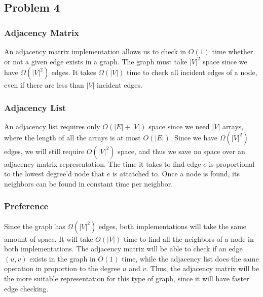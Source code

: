 \documentclass{article}
\begin{document}
\subsection*{Problem 4}
\subsubsection*{Adjacency Matrix}
An adjacency matrix implementation allows us to check in $O(1)$ time whether or not a given edge exists in a graph.
The graph must take $|V|^2$ space since we have $\Omega (|V|^2)$ edges.
It takes $\Omega (|V|)$ time to check all incident edges of a node, even if there are less than $|V|$ incident edges.
\subsubsection*{Adjacency List}
An adjacency list requires only $O(|E| + |V|)$ space since we need $|V|$ arrays,
where the length of all the arrays is at most $O(|E|)$.
Since we have $\Omega (|V|^2)$ edges, we will still require $O(|V|^2)$ space,
and thus we save no space over an adjacency matrix representation.
The time it takes to find edge $e$ is proportional to the lowest degree'd node that $e$ is attatched to.
Once a node is found, its neighbors can be found in constant time per neighbor.
\subsubsection*{Preference}
Since the graph has $\Omega (|V|^2)$ edges,
both implementations will take the same amount of space.
It will take $O(|V|)$ time to find all the neighbors of a node in both implementations.
The adjacency matrix will be able to check if an edge $(u,v)$ exists in the graph in $O(1)$ time,
while the adjacency list does the same operation in proportion to the degree $u$ and $v$.
Thus, the adjacency matrix will be the more suitable representation for this type of graph,
since it will have faster edge checking.
\end{document}
